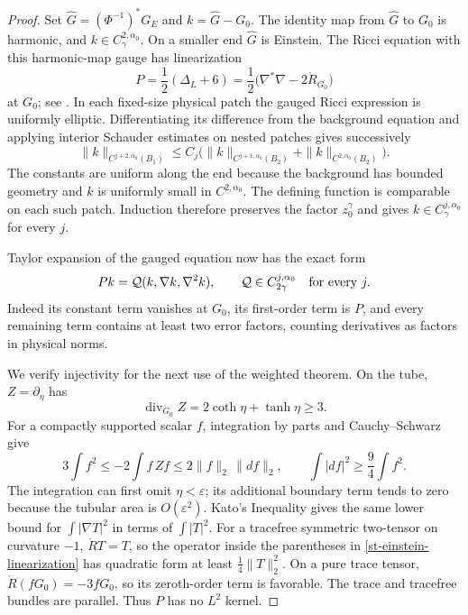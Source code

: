 \begin{proof}
Set $\widehat G=(\Phi^{-1})^*G_E$ and $k=\widehat G-G_0$.
The identity map from $\widehat G$ to $G_0$ is harmonic, and
$k\in C^{2,\alpha_0}_\gamma$.  On a smaller end $\widehat G$
is Einstein.  The Ricci equation with this harmonic-map gauge has
linearization
\begin{equation}
 P=\frac12(\Delta_L+6)
   =\frac12\bigl(\nabla^*\nabla-2\mathring R_{G_0}\bigr)
 \label{st-einstein-linearization}
\end{equation}
at $G_0$; see \cite[Equations~(1.2)--(1.3)]{lee2006}.
In each fixed-size physical patch the gauged Ricci expression is
uniformly elliptic.  Differentiating its difference from the
background equation and applying interior Schauder estimates on
nested patches gives successively
\[
 \|k\|_{C^{j+2,\alpha_0}(B_1)}
 \leq C_j\bigl(\|k\|_{C^{j+1,\alpha_0}(B_2)}
                 +\|k\|_{C^{2,\alpha_0}(B_2)}\bigr).
\]
The constants are uniform along the end because the background has
bounded geometry and $k$ is uniformly small in $C^{2,\alpha_0}$.
The defining function is comparable on each such patch.  Induction
therefore preserves the factor $z_0^\gamma$ and gives
$k\in C^{j,\alpha_0}_\gamma$ for every $j$.

Taylor expansion of the gauged equation now has the exact form
\begin{equation}
 Pk=\mathcal Q(k,\nabla k,\nabla^2k),\qquad
 \mathcal Q\in C^{j,\alpha_0}_{2\gamma}\quad\hbox{for every }j.
 \label{st-quadratic-einstein-error}
\end{equation}
Indeed its constant term vanishes at $G_0$, its first-order term is
$P$, and every remaining term contains at least two error factors,
counting derivatives as factors in physical norms.

We verify injectivity for the next use of the weighted theorem.
On the tube, $Z=\partial_\eta$ has
\[
 \operatorname{div}_{G_0}Z=2\coth\eta+\tanh\eta\geq3.
\]
For a compactly supported scalar $f$, integration by parts and
Cauchy--Schwarz give
\[
 3\int f^2\leq-2\int f\,Zf
 \leq2\|f\|_2\,\|df\|_2,
 \qquad \int|df|^2\geq\frac94\int f^2.
\]
The integration can first omit $\eta<\varepsilon$; its additional
boundary term tends to zero because the tubular area is
$O(\varepsilon^2)$.  Kato's Inequality gives the same lower bound
for $\int|\nabla T|^2$ in terms of $\int|T|^2$.
For a tracefree symmetric two-tensor on curvature $-1$,
$\mathring R T=T$, so the operator inside the parentheses in
\eqref{st-einstein-linearization} has quadratic form at least
$\frac14\|T\|_2^2$.  On a pure trace tensor,
$\mathring R(fG_0)=-3fG_0$, so its zeroth-order term is favorable.
The trace and tracefree bundles are parallel.  Thus $P$ has no
$L^2$ kernel.


\end{proof}
